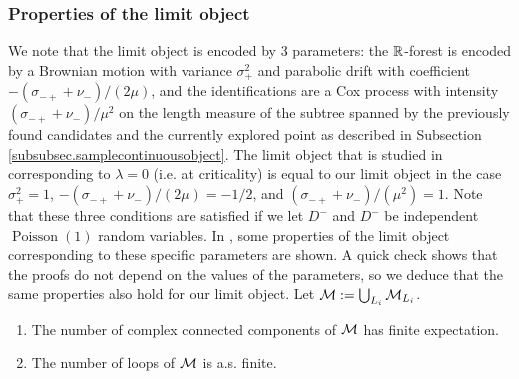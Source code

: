\subsubsection{Properties of the limit object}
We note that the limit object is encoded by $3$ parameters: the ${\mathbb R}$-forest is encoded by a Brownian motion with variance $\sigma_+^2$ and parabolic drift with coefficient $-(\sigma_{-+}+\nu_-)/(2\mu)$, and the identifications are a Cox process with intensity $(\sigma_{-+}+\nu_-)/\mu^2$ on the length measure of the subtree spanned by the previously found candidates and the currently explored point as described in Subsection \ref{subsubsec.samplecontinuousobject}. The limit object that is studied in \cite{goldschmidtScalingLimitCritical2019} corresponding to $\lambda=0$ (i.e. at criticality) is equal to our limit object in the case $\sigma_+^2=1$, $-(\sigma_{-+}+\nu_-)/(2\mu)=-1/2$, and $(\sigma_{-+}+\nu_-)/(\mu^2)=1$. Note that these three conditions are satisfied if we let $D^-$ and $D^-$ be independent $\operatorname{Poisson}(1)$ random variables. In \cite{goldschmidtScalingLimitCritical2019}, some properties of the limit object corresponding to these specific parameters are shown. A quick check shows that the proofs do not depend on the values of the parameters, so we deduce that the same properties also hold for our limit object. Let ${\mathcal M}:=\bigcup_{L_i}{\mathcal M}_{L_i}$.

\begin{corollary}
\begin{enumerate}
    \item The number of complex connected components of ${\mathcal M}$ has finite expectation.
    \item The number of loops of ${\mathcal M}$ is a.s. finite.
\end{enumerate}
\end{corollary}

